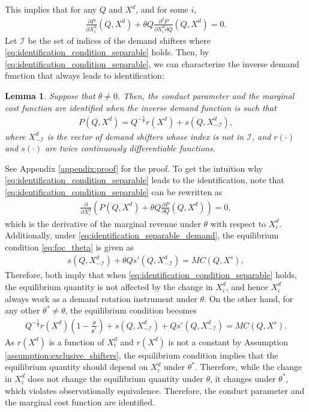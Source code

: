 \documentclass[11pt, a4paper]{article}
\newtheorem{lemma}{Lemma}
\theoremstyle{remark}
\begin{document}
This implies that for any $Q$ and $X^{d}$, and for some $i$, 
\begin{align}
    \frac{\partial P}{\partial X^{d}_i}(Q, X^{d}) + \theta Q\frac{\partial^2 P}{\partial X^{d}_{i}\partial Q}(Q, X^{d}) = 0. \label{eq:identification_condition_separable}
\end{align}
Let $\mathcal{I}$ be the set of indices of the demand shifters where \eqref{eq:identification_condition_separable} holds.
Then, by \eqref{eq:identification_condition_separable}, we can characterize the inverse demand function that always leads to identification:
\begin{lemma}\label{lemma:identification_condition_separable}
    Suppose that $\theta \ne 0$.
    Then, the conduct parameter and the marginal cost function are identified when the inverse demand function is such that
    \begin{align}
        P(Q, X^{d}) = Q^{-\frac{1}{\theta}}r(X^{d}) + s(Q, X^{d}_{-\mathcal{I}}), \label{eq:identification_separable_demand}
    \end{align}
    where $X^{d}_{-\mathcal{I}}$ is the vector of demand shifters whose index is not in $\mathcal{I}$, and $r(\cdot)$ and $s(\cdot)$ are twice continuously differentiable functions.
\end{lemma}
See Appendix \ref{appendix:proof} for the proof.
To get the intuition why \eqref{eq:identification_condition_separable} leads to the identification, note that \eqref{eq:identification_condition_separable} can be rewritten as
\begin{align}
    \frac{\partial }{\partial X^{d}_i}\left( P(Q, X^{d}) + \theta Q \frac{\partial P}{\partial Q}(Q, X^{d})\right) = 0,
\end{align}
which is the derivative of the marginal revenue under $\theta$ with respect to $X^{d}_i$.
Additionally, under \eqref{eq:identification_separable_demand}, the equilibrium condition \eqref{eq:foc_theta} is given as
\begin{align}
    s(Q, X^{d}_{-\mathcal{I}}) + \theta Qs'(Q, X^{d}_{-\mathcal{I}}) = MC(Q, X^{s}),
\end{align}
Therefore, both imply that when \eqref{eq:identification_condition_separable} holds, the equilibrium quantity is not affected by the change in $X^{d}_i$, and hence $X^{d}_i$ always work as a demand rotation instrument under $\theta$.
On the other hand, for any other $\theta^{*} \ne \theta$, the equilibrium condition becomes
\begin{align}
    Q^{-\frac{1}{\theta}}r(X^{d})\left(1 - \frac{\theta}{\theta^{*}}\right) + s(Q, X^{d}_{-\mathcal{I}}) +  Qs'(Q, X^{d}_{-\mathcal{I}}) = MC(Q, X^{s}).
\end{align}
As $r(X^{d})$ is a function of $X^{d}_i$ and  $r(X^{d})$ is not a constant by Assumption \ref{assumption:exclusive_shifters}, the equilibrium condition implies that the equilibrium quantity should depend on $X^{d}_i$ under $\theta^{*}$.
Therefore, while the change in $X^{d}_i$ does not change the equilibrium quantity under $\theta$, it changes under $\theta^{*}$, which violates observationally equivalence.
Therefore, the conduct parameter and the marginal cost function are identified.
\end{document}
